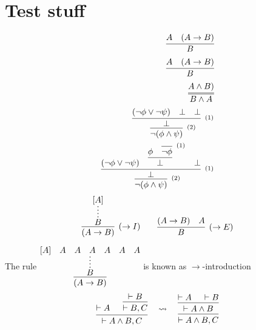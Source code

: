 \documentclass[11pt,a5paper,draft,oneside]{report}
\begin{document}
\chapter{Test stuff}
	\begin{eqnarray}
		\infer{B}{A & (A \rightarrow B)}	\\
		\infer{B}{A & (A \rightarrow B)}	\\
		\infer={B \land A}{A \land B)}		\\
		\infer[^{(2)}]
     {\neg(\phi \land \psi)}
     {\infer[^{(1)}]
        {\bot}
        {(\neg\phi \lor \neg\psi) & \bot & \bot}
     }
     \\
     \infer[^{(2)}]
     {\neg(\phi \land \psi)}
     {\infer[^{(1)}]
        {\bot}
        {(\neg\phi \lor \neg\psi) & 
        \infer
            {\bot}
            {\phi & 
            \infer[^{(1)}]
            {\neg\phi}{}
            } 
        & \bot}
     }\\     
	\end{eqnarray}
$$
\infer[(\to I)]
     {(A \to B)}
     {
     \infer*{B}{[A]}
     }
\qquad
\infer[(\to E)]
     {B}
     {(A \to B) & A}
$$



The rule 
$\vcenter
{
\infer
    {(A \to B)}
    {
    \infer*{B}{[A] & A & A & A & A & A & A}
    }
}$
is known as $\to$-introduction
\newpage
\[
\begin{prooftree}
\Hypo{ \vdash A }
\Hypo{ \vdash B } \Infer1{ \vdash B, C }
\Infer2{ \vdash A\wedge B, C }
\end{prooftree}
%
\quad \rightsquigarrow \quad
\begin{prooftree}
\Hypo{ \vdash A } \Hypo{ \vdash B }
\Infer2{ \vdash A\wedge B }
\Infer1{ \vdash A\wedge B, C }
\end{prooftree}
\]
\end{document}

